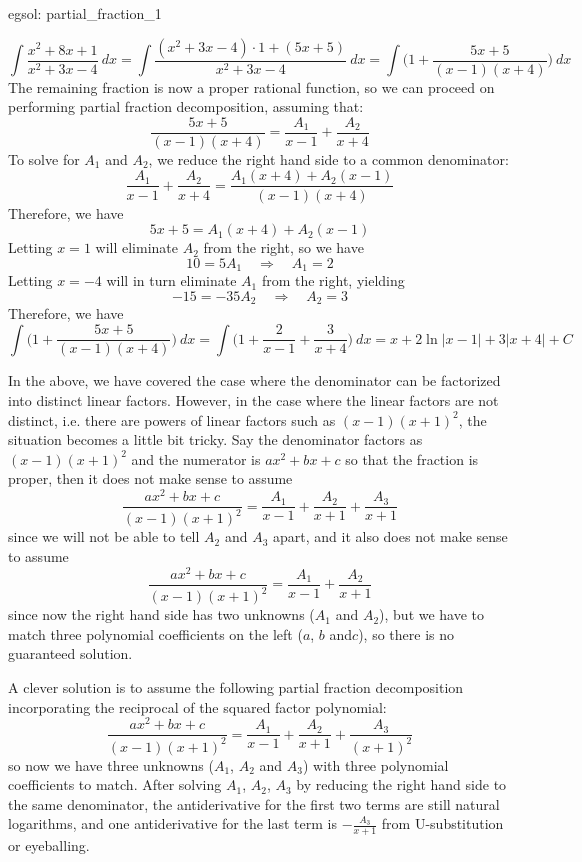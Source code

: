 \begin{egsol}[]{egsol: partial_fraction_1}
\begin{enumerate}[a)]
        \[\int \frac{x^2+8x+1}{x^2+3x-4}~dx = \int \frac{(x^2+3x-4) \cdot 1 + (5x+5)}{x^2+3x-4}~dx = \int \Big(1+\frac{5x+5}{(x-1)(x+4)}\Big)~dx\]
        The remaining fraction is now a proper rational function, so we can proceed on performing partial fraction decomposition, assuming that:
        \[\frac{5x+5}{(x-1)(x+4)} = \frac{A_1}{x-1} + \frac{A_2}{x+4}\]
        To solve for $A_1$ and $A_2$, we reduce the right hand side to a common denominator:
        \[\frac{A_1}{x-1} + \frac{A_2}{x+4} = \frac{A_1(x+4)+A_2(x-1)}{(x-1)(x+4)}\]
        Therefore, we have
        \[5x+5 = A_1(x+4)+A_2(x-1)\]
        Letting $x = 1$ will eliminate $A_2$ from the right, so we have 
        \[10 = 5A_1 \quad \Rightarrow \quad A_1 = 2\]
        Letting $x = -4$ will in turn eliminate $A_1$ from the right, yielding
        \[-15 = -35A_2 \quad \Rightarrow \quad A_2 = 3\]
        Therefore, we have
        \[\int \Big(1+\frac{5x+5}{(x-1)(x+4)}\Big)~dx = \int \Big(1 + \frac{2}{x-1} + \frac{3}{x+4} \Big)~dx = x + 2\ln|x-1| + 3|x+4| + C\]
    \end{enumerate}
\end{egsol}
In the above, we have covered the case where the denominator can be factorized into distinct linear factors.  However, in the case where the linear factors are not distinct, i.e. there are powers of linear factors such as $(x-1)(x+1)^2$, the situation becomes a little bit tricky.  Say the denominator factors as $(x-1)(x+1)^2$ and the numerator is $ax^2 + bx + c$ so that the fraction is proper, then it does not make sense to assume
\[\frac{ax^2+bx+c}{(x-1)(x+1)^2} = \frac{A_1}{x-1} + \frac{A_2}{x+1} + \frac{A_3}{x+1}\]
since we will not be able to tell $A_2$ and $A_3$ apart, and it also does not make sense to assume
\[\frac{ax^2+bx+c}{(x-1)(x+1)^2} = \frac{A_1}{x-1} + \frac{A_2}{x+1}\]
since now the right hand side has two unknowns ($A_1$ and $A_2$), but we have to match three polynomial coefficients on the left ($a$, $b$ and$c$), so there is no guaranteed solution.  

A clever solution is to assume the following partial fraction decomposition incorporating the reciprocal of the squared factor polynomial:
\[\frac{ax^2+bx+c}{(x-1)(x+1)^2} = \frac{A_1}{x-1} + \frac{A_2}{x+1} + \frac{A_3}{(x+1)^2}\]
so now we have three unknowns ($A_1$, $A_2$ and $A_3$) with three polynomial coefficients to match.  After solving $A_1$, $A_2$, $A_3$ by reducing the right hand side to the same denominator, the antiderivative for the first two terms are still natural logarithms, and one antiderivative for the last term is $-\frac{A_3}{x+1}$ from U-substitution or eyeballing.  

